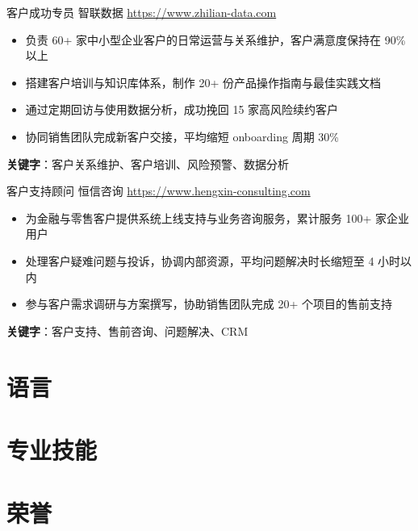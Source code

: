 \documentclass[a4paper, serif, 10pt]{moderncv}
\begin{document}
        {客户成功专员}
        {智联数据}
        {\url{https://www.zhilian-data.com}}
        {}
        {\begin{itemize}
\item 负责 60+ 家中小型企业客户的日常运营与关系维护，客户满意度保持在 90\% 以上
\item 搭建客户培训与知识库体系，制作 20+ 份产品操作指南与最佳实践文档
\item 通过定期回访与使用数据分析，成功挽回 15 家高风险续约客户
\item 协同销售团队完成新客户交接，平均缩短 onboarding 周期 30\%
\end{itemize}
\textbf{关键字}：客户关系维护、客户培训、风险预警、数据分析}

        {客户支持顾问}
        {恒信咨询}
        {\url{https://www.hengxin-consulting.com}}
        {}
        {\begin{itemize}
\item 为金融与零售客户提供系统上线支持与业务咨询服务，累计服务 100+ 家企业用户
\item 处理客户疑难问题与投诉，协调内部资源，平均问题解决时长缩短至 4 小时以内
\item 参与客户需求调研与方案撰写，协助销售团队完成 20+ 个项目的售前支持
\end{itemize}
\textbf{关键字}：客户支持、售前咨询、问题解决、CRM}
\section{语言}

\section{专业技能}

\section{荣誉}
\end{document}
